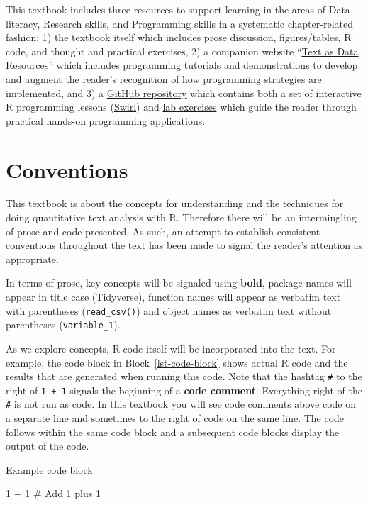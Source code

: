 \documentclass[
  letterpaper,
]{latex/krantz}
\newenvironment{Shaded}{\begin{snugshade}}{\end{snugshade}}
\newcommand{\CommentTok}[1]{\textcolor[rgb]{0.37,0.37,0.37}{#1}}
\newcommand{\DecValTok}[1]{\textcolor[rgb]{0.68,0.00,0.00}{#1}}
\newcommand{\SpecialCharTok}[1]{\textcolor[rgb]{0.37,0.37,0.37}{#1}}
\begin{document}
This textbook includes three resources to support learning in the areas
of Data literacy, Research skills, and Programming skills in a
systematic chapter-related fashion: 1) the textbook itself which
includes prose discussion, figures/tables, R code, and thought and
practical exercises, 2) a companion website
``\href{https://lin380.github.io/tadr/}{Text as Data Resources}'' which
includes programming tutorials and demonstrations to develop and augment
the reader's recognition of how programming strategies are implemented,
and 3) a \href{https://github.com/lin380}{GitHub repository} which
contains both a set of interactive R programming lessons
(\href{https://github.com/lin380/swirl}{Swirl}) and
\href{https://github.com/stars/francojc/lists/labs}{lab exercises} which
guide the reader through practical hands-on programming applications.

\hypertarget{conventions}{%
\section*{Conventions}\label{conventions}}

This textbook is about the concepts for understanding and the techniques
for doing quantitative text analysis with R. Therefore there will be an
intermingling of prose and code presented. As such, an attempt to
establish consistent conventions throughout the text has been made to
signal the reader's attention as appropriate.

In terms of prose, key concepts will be signaled using \textbf{bold},
package names will appear in title case (Tidyverse), function names will
appear as verbatim text with parentheses (\texttt{read\_csv()}) and
object names as verbatim text without parentheses
(\texttt{variable\_1}).

As we explore concepts, R code itself will be incorporated into the
text. For example, the code block in Block~\ref{lst-code-block} shows
actual R code and the results that are generated when running this code.
Note that the hashtag \texttt{\#} to the right of \texttt{1\ +\ 1}
signals the beginning of a \textbf{code comment}. Everything right of
the \texttt{\#} is not run as code. In this textbook you will see code
comments above code on a separate line and sometimes to the right of
code on the same line. The code follows within the same code block and a
subsequent code blocks display the output of the code.

\begin{codelisting}

\caption{Example code block}

\hypertarget{lst-code-block}{%
\label{lst-code-block}}%
\begin{Shaded}
\begin{Highlighting}[]
\DecValTok{1} \SpecialCharTok{+} \DecValTok{1} \CommentTok{\# Add 1 plus 1}
\end{Highlighting}
\end{Shaded}

\end{codelisting}
\end{document}
